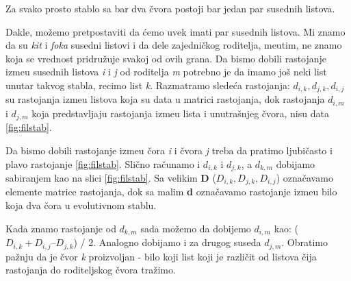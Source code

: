 \begin{teorema}
	Za svako prosto stablo sa bar dva \v{c}vora postoji bar jedan par susednih listova.
\end{teorema}

Dakle, mo\v{z}emo pretpostaviti da \'cemo uvek imati par susednih listova. Mi znamo da su \textit{kit} i \textit{foka} susedni listovi i da dele zajedni\v{c}kog roditelja, me\dj utim, ne znamo koja se vrednost pridru\v{z}uje svakoj od ovih grana. Da bismo dobili rastojanje izme\dj u susednih listova \textit{i} i \textit{j} od roditelja \textit{m} potrebno je da imamo jo\v{s} neki list unutar takvog stabla, recimo list \textit{k}. Razmatramo slede\'ca rastojanja: $d_{i,k}, d_{j, k}, d_{i,j}$ su rastojanja izme\dj u listova koja su data u matrici rastojanja, dok rastojanja $d_{i, m}$ i $d_{j, m}$ koja predstavljaju rastojanja izme\dj u lista i unutra\v{s}njeg \v{c}vora, nisu data \ref{fig:filstab}.

Da bismo dobili rastojanje izme\dj u \v{c}ora \textit{i} i \v{c}vora \textit{j} treba da pratimo ljubi\v{c}asto i plavo rastojanje \ref{fig:filstab}. Sli\v{c}no ra\v{c}unamo i $d_{i, k}$ i $d_{j, k}$, a $d_{k, m}$ dobijamo sabiranjem kao na slici \ref{fig:filstab}. Sa velikim \textbf{D} ($D_{i, k}, D_{j, k}, D_{i, j}$) ozna\v{c}avamo elemente matrice rastojanja, dok sa malim \textbf{d} ozna\v{c}avamo rastojanje izme\dj u bilo koja dva \v{c}ora u evolutivnom stablu. 

Kada znamo rastojanje od $d_{k,m}$ sada mo\v{z}emo da dobijemo $d_{i,m}$ kao: ($D_{i, k} + D_{i, j} – D_{j, k}$) / 2. Analogno dobijamo i za drugog suseda $d_{j, m}$. Obratimo pa\v{z}nju da je \v{c}vor \textit{k} proizvoljan - bilo koji list koji je razli\v{c}it od listova \v{c}ija rastojanja do roditeljskog \v{c}vora tra\v{z}imo.


